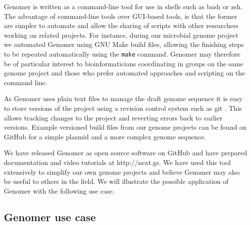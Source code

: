 \documentclass[10pt]{article}
\begin{document}
Genomer is written as a command-line tool for use in shells such as bash or
zsh. The advantage of command-line tools over GUI-based tools, is that the
former are simpler to automate and allow the sharing of scripts with other
researchers working on related projects. For instance, during our microbial
genome project we automated Genomer using GNU Make build files, allowing the
finishing steps to be repeated automatically using the \verb+make+ command.
Genomer may therefore be of particular interest to bioinformaticians
coordinating in groups on the same genome project and those who prefer
automated approaches and scripting on the command line.

As Genomer uses plain text files to manage the draft genome sequence it is easy
to store versions of the project using a revision control system such as git
\cite{git-scm}. This allows tracking changes to the project and reverting
errors back to earlier versions. Example versioned build files from our genome
projects can be found on GitHub for a simple plasmid \cite{plasmid-github} and
a more complex genome \cite{genome-github} sequence.

We have released Genomer as open source software on GitHub
\cite{genomer-github} and have prepared documentation and video tutorials at
http://next.gs. We have used this tool extensively to simplify our own genome
projects and believe Genomer may also be useful to others in the field. We will
illustrate the possible application of Genomer with the following use case.

\subsection*{Genomer use case}
\end{document}

